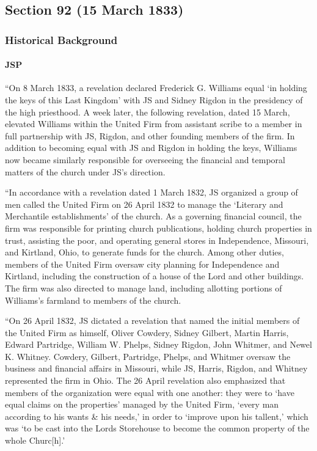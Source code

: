 \subsection{Section 92 (15 March 1833)}
	\label{DC92}
	
	\subsubsection{Historical Background}
		\label{DC92-HB}
		
		\paragraph{JSP}
		
			``On 8 March 1833, a revelation declared Frederick G. Williams equal `in holding the keys of this Last Kingdom' with JS and Sidney Rigdon in the presidency of the high priesthood. A week later, the following revelation, dated 15 March, elevated Williams within the United Firm from assistant scribe to a member in full partnership with JS, Rigdon, and other founding members of the firm. In addition to becoming equal with JS and Rigdon in holding the keys, Williams now became similarly responsible for overseeing the financial and temporal matters of the church under JS's direction.
			
			``In accordance with a revelation dated 1 March 1832, JS organized a group of men called the United Firm on 26 April 1832 to manage the `Literary and Merchantile establishments' of the church. As a governing financial council, the firm was responsible for printing church publications, holding church properties in trust, assisting the poor, and operating general stores in Independence, Missouri, and Kirtland, Ohio, to generate funds for the church. Among other duties, members of the United Firm oversaw city planning for Independence and Kirtland, including the construction of a house of the Lord and other buildings. The firm was also directed to manage land, including allotting portions of Williams's farmland to members of the church.
			
			``On 26 April 1832, JS dictated a revelation that named the initial members of the United Firm as himself, Oliver Cowdery, Sidney Gilbert, Martin Harris, Edward Partridge, William W. Phelps, Sidney Rigdon, John Whitmer, and Newel K. Whitney. Cowdery, Gilbert, Partridge, Phelps, and Whitmer oversaw the business and financial affairs in Missouri, while JS, Harris, Rigdon, and Whitney represented the firm in Ohio. The 26 April revelation also emphasized that members of the organization were equal with one another: they were to `have equal claims on the properties' managed by the United Firm, `every man according to his wants \& his needs,' in order to `improve upon his tallent,' which was `to be cast into the Lords Storehouse to become the common property of the whole Churc[h].'
			
